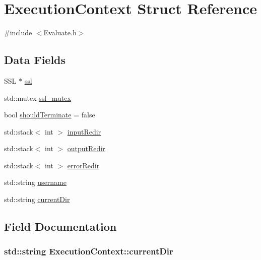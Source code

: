 \hypertarget{structExecutionContext}{}\section{Execution\+Context Struct Reference}
\label{structExecutionContext}


{\ttfamily \#include $<$Evaluate.\+h$>$}

\subsection*{Data Fields}
\begin{DoxyCompactItemize}
\item 
S\+SL $\ast$ \hyperlink{structExecutionContext_afce3bfa5f05214b9b0d57ac1edb0a0f4}{ssl}
\item 
std\+::mutex \hyperlink{structExecutionContext_a241cad372197f9880a9af9e93ecd7633}{ssl\+\_\+mutex}
\item 
bool \hyperlink{structExecutionContext_a3b3a2c509c6c08190a8ee67e39dd80cf}{should\+Terminate} = false
\item 
std\+::stack$<$ int $>$ \hyperlink{structExecutionContext_a33562118feda5571fe0ba87186670679}{input\+Redir}
\item 
std\+::stack$<$ int $>$ \hyperlink{structExecutionContext_a15af12d7e8146ae1a5f091b7d9919c8c}{output\+Redir}
\item 
std\+::stack$<$ int $>$ \hyperlink{structExecutionContext_aa5d29389a31755f8a0c1099f7c7768bf}{error\+Redir}
\item 
std\+::string \hyperlink{structExecutionContext_a6c1bbd4dcfc82e4902c4382af69ab6d9}{username}
\item 
std\+::string \hyperlink{structExecutionContext_ad3a0ccfbff4fe1b7b0f5ced3a58dca32}{current\+Dir}
\end{DoxyCompactItemize}


\subsection{Field Documentation}
\subsubsection[{\texorpdfstring{current\+Dir}{currentDir}}]{\setlength{\rightskip}{0pt plus 5cm}std\+::string Execution\+Context\+::current\+Dir}\hypertarget{structExecutionContext_ad3a0ccfbff4fe1b7b0f5ced3a58dca32}{}\label{structExecutionContext_ad3a0ccfbff4fe1b7b0f5ced3a58dca32}
